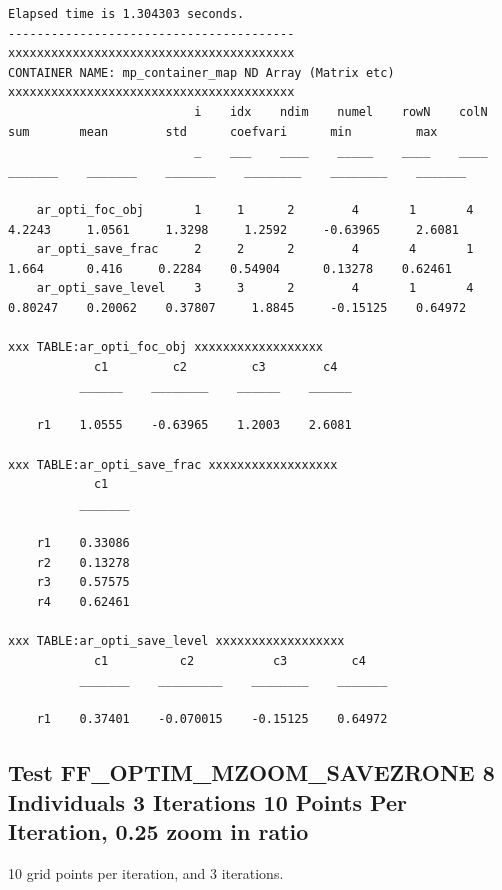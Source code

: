 \documentclass[
]{book}
\begin{document}
\begin{verbatim}
Elapsed time is 1.304303 seconds.
----------------------------------------
xxxxxxxxxxxxxxxxxxxxxxxxxxxxxxxxxxxxxxxx
CONTAINER NAME: mp_container_map ND Array (Matrix etc)
xxxxxxxxxxxxxxxxxxxxxxxxxxxxxxxxxxxxxxxx
                          i    idx    ndim    numel    rowN    colN      sum       mean        std      coefvari      min         max  
                          _    ___    ____    _____    ____    ____    _______    _______    _______    ________    ________    _______

    ar_opti_foc_obj       1     1      2        4       1       4       4.2243     1.0561     1.3298     1.2592     -0.63965     2.6081
    ar_opti_save_frac     2     2      2        4       4       1        1.664      0.416     0.2284    0.54904      0.13278    0.62461
    ar_opti_save_level    3     3      2        4       1       4      0.80247    0.20062    0.37807     1.8845     -0.15125    0.64972

xxx TABLE:ar_opti_foc_obj xxxxxxxxxxxxxxxxxx
            c1         c2         c3        c4  
          ______    ________    ______    ______

    r1    1.0555    -0.63965    1.2003    2.6081

xxx TABLE:ar_opti_save_frac xxxxxxxxxxxxxxxxxx
            c1   
          _______

    r1    0.33086
    r2    0.13278
    r3    0.57575
    r4    0.62461

xxx TABLE:ar_opti_save_level xxxxxxxxxxxxxxxxxx
            c1          c2           c3         c4   
          _______    _________    ________    _______

    r1    0.37401    -0.070015    -0.15125    0.64972
\end{verbatim}

\hypertarget{test-ff_optim_mzoom_savezrone-8-individuals-3-iterations-10-points-per-iteration-0.25-zoom-in-ratio}{%
\subsection{Test FF\_OPTIM\_MZOOM\_SAVEZRONE 8 Individuals 3 Iterations 10 Points Per Iteration, 0.25 zoom in ratio}\label{test-ff_optim_mzoom_savezrone-8-individuals-3-iterations-10-points-per-iteration-0.25-zoom-in-ratio}}

10 grid points per iteration, and 3 iterations.
\end{document}
